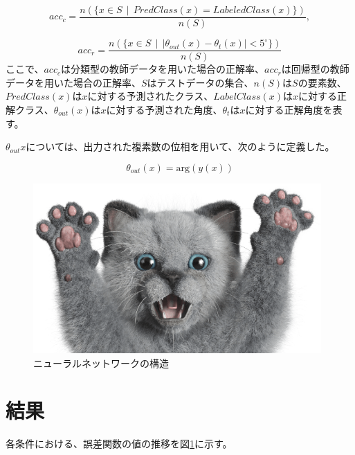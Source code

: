 \documentclass[11pt,a4paper,uplatex,draft]{ujarticle}
\begin{document}
  \begin{equation}
    acc_{c} = \frac{n(\{x \in S \, \mid\, PredClass(x) = LabeledClass(x)\})}{n(S)},
  \end{equation} %

  \begin{equation}
    acc_{r} = \frac{n(\{x \in S \, \mid\, |\theta_{out}(x) - \theta_{t}(x)| < 5^{\circ}\})}{n(S)}
  \end{equation} %
  ここで、$acc_c$は分類型の教師データを用いた場合の正解率、$acc_r$は回帰型の教師データを用いた場合の正解率、$S$はテストデータの集合、$n(S)$は$S$の要素数、
  $PredClass(x)$は$x$に対する予測されたクラス、$LabelClass(x)$は$x$に対する正解クラス、$\theta_{out}(x)$は$x$に対する予測された角度、$\theta_{t}$は$x$に対する正解角度を表す。

  $\theta_{out}{x}$については、出力された複素数の位相を用いて、次のように定義した。

  \begin{equation}
    \theta_{out}(x) = \mathrm{arg}(y(x))
  \end{equation} %

  \begin{figure}[hbtp]
    \centering
    \includegraphics[keepaspectratio, width=110mm]{Images/sampleneko.png}
    \caption{ニューラルネットワークの構造}
    \label{fig:neuralnet}
  \end{figure}
  

\section{結果}
  各条件における、誤差関数の値の推移を図\ref{}に示す。
\end{document}
